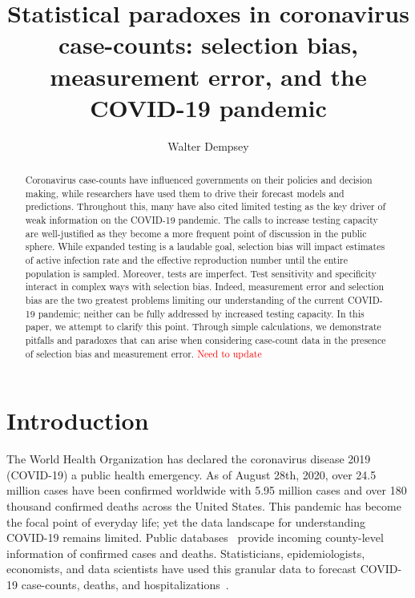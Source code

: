 \documentclass[11pt]{amsart}
\begin{document}
\title[Statistical paradoxes in coronavirus case-counts]{Statistical paradoxes in coronavirus case-counts: selection bias, measurement error, and the COVID-19 pandemic} %

\author{Walter Dempsey}
\address{Department of Biostatistics, University of Michigan, Ann Arbor, MI 48109}

\begin{abstract}
  Coronavirus case-counts have influenced governments on their policies and decision making, while researchers have used them to drive their forecast models and predictions. Throughout this, many have also cited limited testing as the key driver of weak information on the COVID-19 pandemic. The calls to increase testing capacity are well-justified as they become a more frequent point of discussion in the public sphere. While expanded testing is a laudable goal, selection bias will impact estimates of active infection rate and the effective reproduction number until the entire population is sampled. Moreover, tests are imperfect. Test sensitivity and specificity interact in complex ways with selection bias. Indeed, measurement error and selection bias are the two greatest problems limiting our understanding of the current COVID-19 pandemic; neither can be fully addressed by increased testing capacity. In this paper, we attempt to clarify this point. Through simple calculations, we demonstrate pitfalls and paradoxes that can arise when considering case-count data in the presence of selection bias and measurement error.  \textcolor{red}{Need to update}
\end{abstract}

\maketitle


\section{Introduction}
The World Health Organization has declared the coronavirus disease 2019 (COVID-19) a public health emergency.  As of August 28th, 2020, over 24.5 million cases have been confirmed worldwide with 5.95 million cases and over 180 thousand confirmed deaths across the United States. This pandemic
has become the focal point of everyday life; yet the data landscape for understanding COVID-19 remains limited.  Public databases~\citep{JHU_Lancet,NYT} provide incoming county-level information of confirmed cases and deaths.  Statisticians, epidemiologists, economists, and data scientists have used this granular data to forecast COVID-19 case-counts, deaths, and hospitalizations~\citep{Giordano2020,Song2020,Ray2020,2020.IHME,Wang2020.03,JTD36385}.
\end{document}
